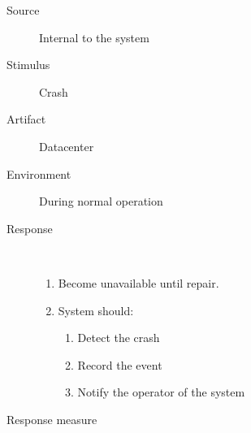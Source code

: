 \begin{description}
	\item[Source] Internal to the system
	\item[Stimulus] Crash
	\item[Artifact] Datacenter
	\item[Environment] During normal operation
	\item[Response] \
	\begin{enumerate}
	  \item Become unavailable until repair.  
	  \item System should:
	  \begin{enumerate}
	  	\item Detect the crash
	  	\item Record the event
	  	\item Notify the operator of the system
	  \end{enumerate}
	\end{enumerate}
	\item[Response measure] \ %
\end{description}